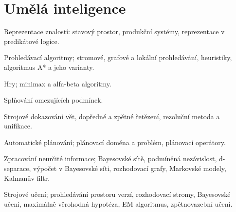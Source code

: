 \newpage
\section{Umělá inteligence}
\begin{pozadavky}
\begin{pitemize}
\item Reprezentace znalostí: stavový prostor, produkční systémy, reprezentace v predikátové logice.
\item Prohledávací algoritmy; stromové, grafové a lokální prohledávání, heuristiky, algoritmus A* a jeho varianty.
\item Hry; minimax a alfa-beta algoritmy.
\item Splňování omezujících podmínek.
\item Strojové dokazování vět, dopředné a zpětné řetězení, rezoluční metoda a unifikace.
\item Automatické plánování; plánovací doména a problém, plánovací operátory.
\item Zpracování neurčité informace; Bayesovské sítě, podmíněná nezávislost, d-separace, výpočet v Bayesovské síti, rozhodovací grafy, Markovské modely, Kalmanův filtr.
\item Strojové učení; prohledávání prostoru verzí, rozhodovací stromy, Bayesovské učení, maximálně věrohodná hypotéza, EM algoritmus, zpětnovazební učení.
\end{pitemize}
\end{pozadavky}